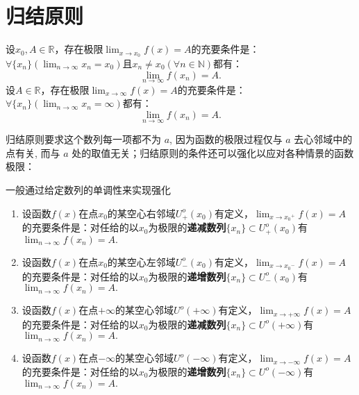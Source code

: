 \section{归结原则}

\begin{theorem}[归结原则]
	设$x_0,A\in\mathbb{R}$，存在极限$\displaystyle\lim_{x\to x_0}f(x)=A$的充要条件是：$\forall\{x_n\}(\displaystyle\lim_{n\to\infty}x_n=x_0)$且$x_n\neq x_0(\forall n\in\mathbb{N})$都有：
	\begin{equation}
		\displaystyle\lim_{n\to\infty}f(x_n)=A.
	\end{equation}
	设$A\in\mathbb{R}$，存在极限$\displaystyle\lim_{x\to \infty}f(x)=A$的充要条件是：$\forall\{x_n\}(\displaystyle\lim_{n\to\infty}x_n=\infty)$都有：
	\begin{equation}
		\displaystyle\lim_{n\to\infty}f(x_n)=A.
	\end{equation}
\end{theorem}

归结原则要求这个数列每一项都不为 $𝑎$, 因为函数的极限过程仅与 $𝑎$ 去心邻域中的点有关, 而与 $𝑎$ 处的取值无关；归结原则的条件还可以强化以应对各种情景的函数极限：

\begin{corollary}[归结原则的强化]
	一般通过给定数列的单调性来实现强化
	\begin{enumerate}
		\item 设函数$f(x)$在点$x_0$的某空心右邻域$U^o_+(x_0)$有定义，$\displaystyle\lim_{x\to {x_0}^+}f(x)=A$的充要条件是：对任给的以$x_0$为极限的\textbf{递减数列}$\{x_n\}\subset U^o_+(x_0)$有$\displaystyle\lim_{n\to \infty}f(x_n)=A.$
		\item 设函数$f(x)$在点$x_0$的某空心左邻域$U^o_-(x_0)$有定义，$\displaystyle\lim_{x\to {x_0}^-}f(x)=A$的充要条件是：对任给的以$x_0$为极限的\textbf{递增数列}$\{x_n\}\subset U^o_-(x_0)$有$\displaystyle\lim_{n\to \infty}f(x_n)=A.$
		\item 设函数$f(x)$在点$+\infty$的某空心邻域$U^o(+\infty)$有定义，$\displaystyle\lim_{x\to  +\infty}f(x)=A$的充要条件是：对任给的以$x_0$为极限的\textbf{递减数列}$\{x_n\}\subset U^o(+\infty)$有$\displaystyle\lim_{n\to \infty}f(x_n)=A.$
		\item 设函数$f(x)$在点$-\infty$的某空心邻域$U^o(-\infty)$有定义，$\displaystyle\lim_{x\to  -\infty}f(x)=A$的充要条件是：对任给的以$x_0$为极限的\textbf{递增数列}$\{x_n\}\subset U^o(-\infty)$有$\displaystyle\lim_{n\to \infty}f(x_n)=A.$
	\end{enumerate}
\end{corollary}